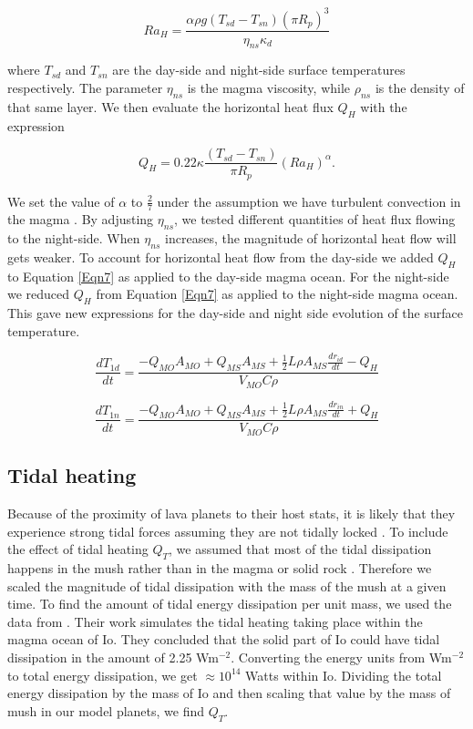 \documentclass[fleqn,usenatbib]{mnras}
\begin{document}
\begin{equation}
\label{Eqn23}
Ra_{H} = \frac{ \alpha \rho g (T_{sd} - T_{sn}) (\pi R_{p})^{3}}{\eta_{ns} \kappa _{d}}
\end{equation}

\noindent where $T_{sd}$ and $T_{sn}$ are the day-side and night-side surface temperatures respectively. The parameter $\eta_{ns}$ is the magma viscosity, while $\rho_{ns}$ is the density of that same layer. We then evaluate the horizontal heat flux $Q_{H}$ with the expression 

\begin{equation}
\label{Eqn24}
Q_{H} = 0.22 \kappa \frac{(T_{sd} - T_{sn})}{\pi R_{p}} (Ra_{H})^{\alpha} .
\end{equation}

\noindent We set the value of $\alpha$ to $\frac{2}{7}$ under the assumption we have turbulent convection in the magma \citep{Hugh2008}. By adjusting $\eta_{ns}$, we tested different quantities of heat flux flowing to the night-side. When $\eta_{ns}$ increases, the magnitude of horizontal heat flow will gets weaker. To account for horizontal heat flow from the day-side we added $Q_{H}$ to Equation \ref{Eqn7} as applied to the day-side magma ocean. For the night-side we reduced $Q_{H}$ from Equation \ref{Eqn7} as applied to the night-side magma ocean. This gave new expressions for the day-side and night side evolution of the surface temperature. 


\begin{equation}
\label{Eqn25}
\frac{dT_{1d}}{dt} = \frac{-Q_{MO} A_{MO} + Q_{MS} A_{MS} + \frac{1}{2} L \rho A_{MS} \frac{dr_{id}}{dt} - Q_{H}}{V_{MO} C \rho}
\end{equation}

\begin{equation}
\label{Eqn26}
\frac{dT_{1n}}{dt} = \frac{-Q_{MO} A_{MO} + Q_{MS} A_{MS} + \frac{1}{2} L \rho A_{MS} \frac{dr_{in}}{dt} + Q_{H}}{V_{MO} C \rho}
\end{equation}


\subsection{Tidal heating}   \label{sec2.3}

Because of the proximity of lava planets to their host stats, it is likely that they experience strong tidal forces assuming they are not tidally locked \citep{Leger2011}. To include the effect of tidal heating $Q_{T}$, we assumed that most of the tidal dissipation happens in the mush rather than in the magma or solid rock \citep{Kerv2021}. Therefore we scaled the magnitude of tidal dissipation with the mass of the mush at a given time. To find the amount of tidal energy dissipation per unit mass, we used the data from \cite{Ty2015}. Their work simulates the tidal heating taking place within the magma ocean of Io. They concluded that the solid part of Io could have tidal dissipation in the amount of 2.25 Wm$^{-2}$. Converting the energy units from Wm$^{-2}$ to total energy dissipation, we get $\approx 10^{14}$ Watts within Io. Dividing the total energy dissipation by the mass of Io and then scaling that value by the mass of mush in our model planets, we find $Q_{T}$. 
\end{document}
